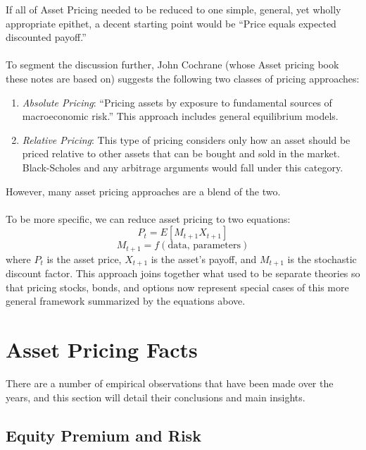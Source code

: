 \documentclass[12pt]{article}
\theoremstyle{plain}
\theoremstyle{definition}
\theoremstyle{remark}
\begin{document}
If all of Asset Pricing needed to be reduced to one simple,
general, yet wholly appropriate epithet, a decent starting
point would be ``Price equals expected discounted payoff.''
\\
\\
To segment the discussion further, John Cochrane (whose Asset pricing book
these notes are based on) suggests the following two classes of pricing
approaches:
\begin{enumerate}
    \item {\sl Absolute Pricing}: ``Pricing assets by exposure
	to fundamental sources of macroeconomic risk.'' This
	approach includes general equilibrium models.
    \item {\sl Relative Pricing}: This type of pricing considers
	only how an asset should be priced relative to
	other assets that can be bought and sold in the
	market. Black-Scholes and any arbitrage arguments
	would fall under this category.
\end{enumerate}
However, many asset pricing approaches are a blend of the two.
\\
\\
To be more specific, we can reduce asset pricing to two
equations:
\begin{equation}
    P_t = E[M_{t+1} X_{t+1} ]
\end{equation}
\begin{equation}
    M_{t+1} = f(\text{data, parameters})
\end{equation}
where $P_t$ is the asset price, $X_{t+1}$ is the asset's payoff,
and $M_{t+1}$ is the stochastic discount factor.
This approach joins together what used to be separate theories so
that pricing stocks, bonds, and options now represent special
cases of this more general framework summarized by the equations above.


\section{Asset Pricing Facts}

There are a number of empirical observations that have been made
over the years, and this section will detail their conclusions
and main insights.

\subsection{Equity Premium and Risk}
\end{document}
